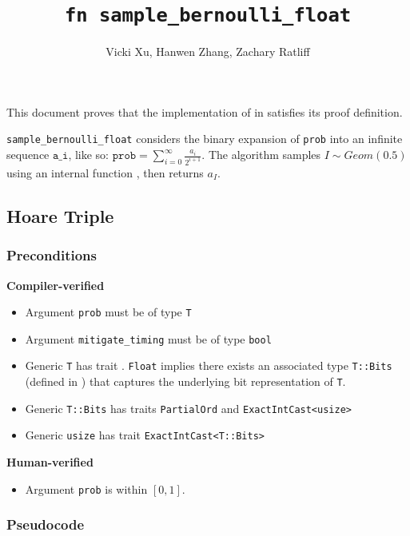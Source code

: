 \documentclass{article}
\title{\texttt{fn sample\_bernoulli\_float}}
\author{Vicki Xu, Hanwen Zhang, Zachary Ratliff}
\begin{document}
 
\maketitle 

\timingMitigation
 
This document proves that the implementation of  in   
satisfies its proof definition. 
 
\texttt{sample\_bernoulli\_float} considers the binary expansion of \texttt{prob} into an infinite sequence $\texttt{a\_i}$,  
like so: $\texttt{prob} = \sum_{i = 0}^{\infty} \frac{a_i}{2^{i + 1}}$.  
The algorithm samples $I \sim Geom(0.5)$ using an internal function , then returns $a_I$.  
 
\subsection{Hoare Triple} 
\subsubsection*{Preconditions} 
\textbf{Compiler-verified} 
\begin{itemize} 
    \item Argument \texttt{prob} must be of type \texttt{T} 
    \item Argument \texttt{mitigate\_timing} must be of type \texttt{bool} 
    \item Generic \texttt{T} has trait .  
        \texttt{Float} implies there exists an associated type \texttt{T::Bits} (defined in ) that captures the underlying bit representation of \texttt{T}. 
    \item Generic \texttt{T::Bits} has traits \texttt{PartialOrd} and \texttt{ExactIntCast<usize>} 
    \item Generic \texttt{usize} has trait \texttt{ExactIntCast<T::Bits>} 
\end{itemize} 

\textbf{Human-verified}
\begin{itemize} 
    \item Argument \texttt{prob} is within $[0, 1]$.
\end{itemize} 
 
\subsubsection*{Pseudocode} 
 
\end{document}
